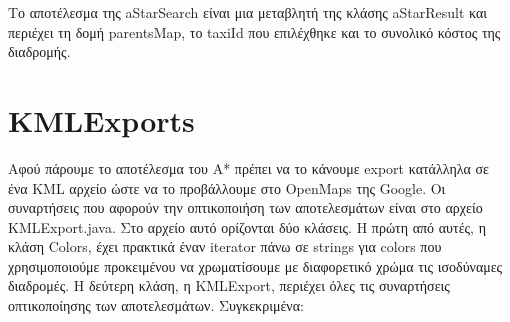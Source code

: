\documentclass[a4paper,oneside, 11pt]{article}
\begin{document}
Το αποτέλεσμα της aStarSearch είναι μια μεταβλητή της κλάσης aStarResult και περιέχει τη δομή parentsMap, το taxiId που επιλέχθηκε και το συνολικό κόστος της διαδρομής. 


\section{KMLExports}
Αφού πάρουμε το αποτέλεσμα του A* πρέπει να το κάνουμε export κατάλληλα σε ένα KML αρχείο ώστε να το προβάλλουμε στο OpenMaps της Google. Οι συναρτήσεις που αφορούν την οπτικοποιήση των αποτελεσμάτων είναι στο αρχείο KMLExport.java. Στο αρχείο αυτό ορίζονται δύο κλάσεις. Η πρώτη από αυτές, η κλάση Colors, έχει πρακτικά έναν iterator πάνω σε strings για colors που χρησιμοποιούμε προκειμένου να χρωματίσουμε με διαφορετικό χρώμα τις ισοδύναμες διαδρομές. Η δεύτερη κλάση, η KMLExport, περιέχει όλες τις συναρτήσεις οπτικοποίησης των αποτελεσμάτων. Συγκεκριμένα:
\end{document}

